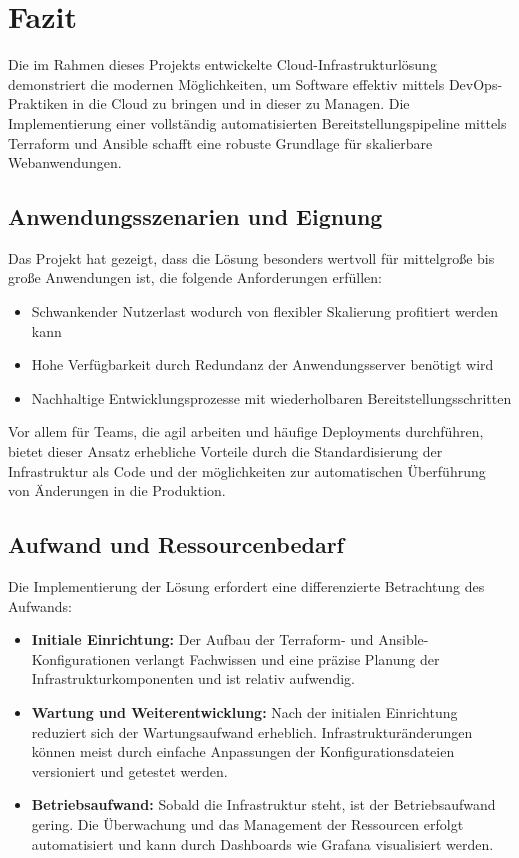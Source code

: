 \chapter{Fazit}

Die im Rahmen dieses Projekts entwickelte Cloud-Infrastrukturlösung demonstriert die modernen Möglichkeiten, um Software effektiv mittels DevOps-Praktiken in die Cloud zu bringen und in dieser zu Managen. Die Implementierung einer vollständig automatisierten Bereitstellungspipeline mittels Terraform und Ansible schafft eine robuste Grundlage für skalierbare Webanwendungen.

\section{Anwendungsszenarien und Eignung}

Das Projekt hat gezeigt, dass die Lösung besonders wertvoll für mittelgroße bis große Anwendungen ist, die folgende Anforderungen erfüllen:

\begin{itemize}
    \item Schwankender Nutzerlast wodurch von flexibler Skalierung profitiert werden kann
    \item Hohe Verfügbarkeit durch Redundanz der Anwendungsserver benötigt wird
    \item Nachhaltige Entwicklungsprozesse mit wiederholbaren Bereitstellungsschritten
\end{itemize}

Vor allem für Teams, die agil arbeiten und häufige Deployments durchführen, bietet dieser Ansatz erhebliche Vorteile durch die Standardisierung der Infrastruktur als Code und der möglichkeiten zur automatischen Überführung von Änderungen in die Produktion.

\section{Aufwand und Ressourcenbedarf}

Die Implementierung der Lösung erfordert eine differenzierte Betrachtung des Aufwands:

\begin{itemize}
    \item \textbf{Initiale Einrichtung:} Der Aufbau der Terraform- und Ansible-Konfigurationen verlangt Fachwissen und eine präzise Planung der Infrastrukturkomponenten und ist relativ aufwendig.
    \item \textbf{Wartung und Weiterentwicklung:} Nach der initialen Einrichtung reduziert sich der Wartungsaufwand erheblich. Infrastrukturänderungen können meist durch einfache Anpassungen der Konfigurationsdateien versioniert und getestet werden.
    \item \textbf{Betriebsaufwand:} Sobald die Infrastruktur steht, ist der Betriebsaufwand gering. Die Überwachung und das Management der Ressourcen erfolgt automatisiert und kann durch Dashboards wie Grafana visualisiert werden. 
\end{itemize}

